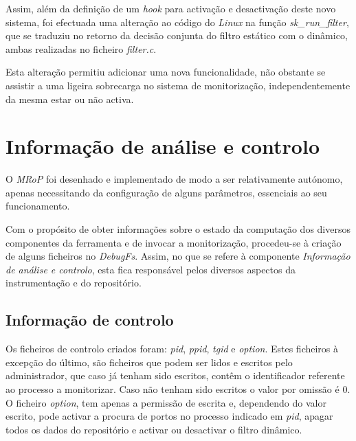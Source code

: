 Assim, além da definição de um \textit{hook} para activação e desactivação deste novo sistema, foi efectuada uma alteração ao código do \textit{Linux} na função \textit{sk\_run\_filter}, que se traduziu no retorno da decisão conjunta do filtro estático com o dinâmico, ambas realizadas no ficheiro \textit{filter.c}.

Esta alteração permitiu adicionar uma nova funcionalidade, não obstante se assistir a uma ligeira sobrecarga no sistema de monitorização, independentemente da mesma estar ou não activa.



\section{Informação de análise e controlo}

O \textit{MRoP} foi desenhado e implementado de modo a ser relativamente autónomo, apenas necessitando da configuração de alguns parâmetros, essenciais ao seu funcionamento.

Com o propósito de obter informações sobre o estado da computação dos diversos componentes da ferramenta e de invocar a monitorização, procedeu-se à criação de alguns ficheiros no \textit{DebugFs}.
Assim, no que se refere à componente \textit{Informação de análise e controlo}, esta fica responsável pelos diversos aspectos da instrumentação e do repositório.

\subsection{Informação de controlo}

Os ficheiros de controlo criados foram: \textit{pid}, \textit{ppid}, \textit{tgid} e \textit{option}.
Estes ficheiros à excepção do último, são ficheiros que podem ser lidos e escritos pelo administrador, que caso já tenham sido escritos, contêm o identificador referente ao processo a monitorizar.
Caso não tenham sido escritos o valor por omissão é 0.
O ficheiro \textit{option}, tem apenas a permissão de escrita e, dependendo do valor escrito, pode activar a procura de portos no processo indicado em \textit{pid}, apagar todos os dados do repositório e activar ou desactivar o filtro dinâmico.

